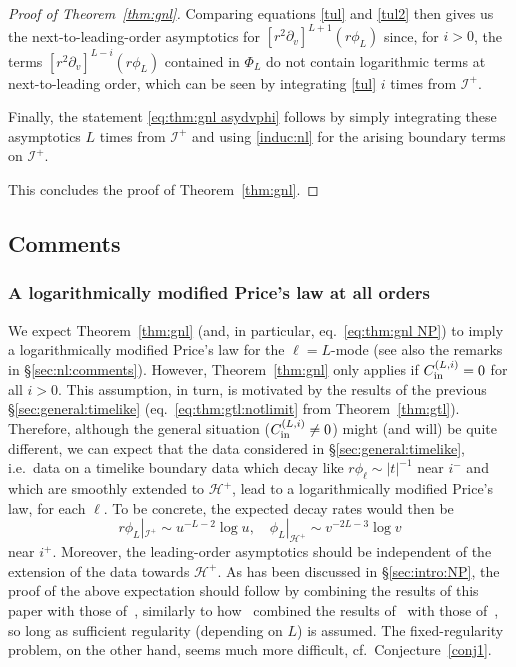 \documentclass[11pt,english]{article}
\numberwithin{equation}{section}
\theoremstyle{remark}
\theoremstyle{plain}
\theoremstyle{remark}
\newcommand{\pv}{\partial_v}
\renewcommand{\(}{\left(}
\renewcommand{\)}{\right)}
\begin{document}
\begin{proof}[Proof of Theorem~\ref{thm:gnl}]
Comparing equations \eqref{tul} and \eqref{tul2} then gives us the next-to-leading-order asymptotics for $[r^2\pv]^{L+1}(r\phi_L)$ since, for $i>0$, the terms $[r^2\pv]^{L-i}(r\phi_L)$ contained in $\Phi_L$ do not contain logarithmic terms at next-to-leading order, which can be seen by integrating \eqref{tul} $i$ times from $\mathcal I^+$.

Finally, the statement \eqref{eq:thm:gnl asydvphi} follows by simply integrating these asymptotics $L$ times from $\mathcal{I}^+$ and using \eqref{induc:nl} for the arising boundary terms on $\mathcal{I}^+$.

This concludes the proof of Theorem~\ref{thm:gnl}.\end{proof}
\subsection{Comments}\label{sec:gnl:comments}
\subsubsection{A logarithmically modified Price's law at all orders}
We expect Theorem~\ref{thm:gnl} (and, in particular, eq.\ \eqref{eq:thm:gnl NP}) to imply a logarithmically modified Price's law for the $\ell=L$-mode (see also the remarks in \S \ref{sec:nl:comments}). 
However, Theorem~\ref{thm:gnl} only applies if $C_{\mathrm{in}}^{(L,i)}=0$ for all $i>0$. 
This assumption, in turn, is motivated by the results of the previous \S\ref{sec:general:timelike} (eq.\ \eqref{eq:thm:gtl:notlimit} from Theorem~\ref{thm:gtl}).
Therefore, although the general situation ($C_{\mathrm{in}}^{(L,i)}\neq0$) might (and will) be quite different, we can expect that the data considered in \S \ref{sec:general:timelike}, i.e.\ data on a timelike boundary data which decay like $r\phi_\ell\sim |t|^{-1}$ near $i^-$ and which are smoothly extended to $\mathcal H^+$, lead to a logarithmically modified Price's law, for each $\ell$.
To be concrete, the expected decay rates would then be
\begin{equation}
r\phi_L|_{\mathcal{I}^+}\sim u^{-L-2}\log u,\quad \phi_L|_{\mathcal{H}^+}\sim v^{-2L-3}\log v
\end{equation}
near $i^+$.  Moreover, the leading-order asymptotics should be independent of the extension of the data towards $\mathcal H^+$.
 As has been discussed in \S \ref{sec:intro:NP}, the proof of the above expectation should follow by combining the results of this paper with those of~\cite{AAG21}, similarly to how~\cite{II} combined the results of~\cite{I} with those of~\cite{AAG18a,AAG18b}, so long as sufficient regularity (depending on $L$) is assumed. The fixed-regularity problem, on the other hand, seems much more difficult, cf.\ Conjecture~\ref{conj1}.
\end{document}
